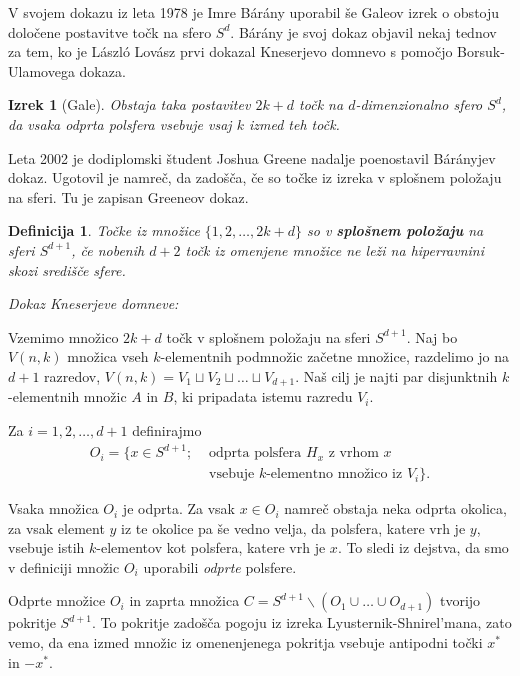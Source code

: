 \documentclass[a4paper,12pt]{article}
\newtheorem{izrek}{Izrek}
\newtheorem{definicija}{Definicija}
\begin{document}
V svojem dokazu iz leta 1978 je Imre Bárány uporabil še Galeov izrek o obstoju določene postavitve točk na sfero $S^d$. Bárány je svoj dokaz objavil nekaj tednov za tem, ko je László Lovász prvi dokazal Kneserjevo domnevo s pomočjo Borsuk-Ulamovega dokaza.

\begin{izrek}[Gale]
Obstaja taka postavitev $2k+d$ točk na $d$-dimenzionalno sfero $S^d$, da vsaka odprta polsfera vsebuje vsaj $k$ izmed teh točk.
\end{izrek}

Leta 2002 je dodiplomski študent Joshua Greene nadalje poenostavil Bárányjev dokaz. Ugotovil je namreč, da zadošča, če so točke iz izreka v splošnem položaju na sferi. Tu je zapisan Greeneov dokaz.

\begin{definicija}
Točke iz množice $\{1,2,\ldots,2k+d\}$ so v \textbf {splošnem položaju} na sferi $S^{d+1}$, če nobenih $d+2$ točk iz omenjene množice ne leži na hiperravnini skozi središče sfere.
\end{definicija}

\noindent
{\em Dokaz Kneserjeve domneve:}

\indent Vzemimo množico $2k+d$ točk v splošnem položaju na sferi $S^{d+1}$. Naj bo $V(n,k)$ množica vseh $k$-elementnih podmnožic začetne množice, razdelimo jo na $d+1$ razredov, $V(n,k) = V_1 \sqcup V_2 \sqcup \ldots \sqcup V_{d+1}$. Naš cilj je najti par disjunktnih $k$-elementnih množic $A$ in $B$, ki pripadata istemu razredu $V_i$.

Za $i=1, 2,\ldots, d+1$ definirajmo
\begin{align*} O_i = \{x \in S^{d+1}; &\text{ odprta polsfera } H_x \text{ z vrhom } x \\ &\text{ vsebuje } k\text{-elementno množico iz } V_i\}.
\end{align*}

Vsaka množica $O_i$ je odprta. Za vsak $x \in O_i$ namreč obstaja neka odprta okolica, za vsak element $y$ iz te okolice pa še vedno velja, da polsfera, katere vrh je $y$, vsebuje istih $k$-elementov kot polsfera, katere vrh je $x$. To sledi iz dejstva, da smo v definiciji množic $O_i$ uporabili {\em odprte} polsfere.

Odprte množice $O_i$ in zaprta množica $C = S^{d+1} \backslash (O_1 \cup \ldots \cup O_{d+1})$ tvorijo pokritje $S^{d+1}$. To pokritje zadošča pogoju iz izreka Lyusternik-Shnirel'mana, zato vemo, da ena izmed množic iz omenenjenega pokritja vsebuje antipodni točki $x^*$ in $-x^*$. 
\end{document}
